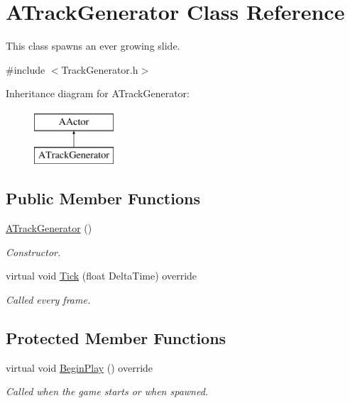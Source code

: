\hypertarget{class_a_track_generator}{}\section{A\+Track\+Generator Class Reference}
\label{class_a_track_generator}


This class spawns an ever growing slide.  




{\ttfamily \#include $<$Track\+Generator.\+h$>$}

Inheritance diagram for A\+Track\+Generator\+:\begin{figure}[H]
\begin{center}
\leavevmode
\includegraphics[height=2.000000cm]{class_a_track_generator}
\end{center}
\end{figure}
\subsection*{Public Member Functions}
\begin{DoxyCompactItemize}
\item 
\mbox{\label{class_a_track_generator_a3383e7f98eb7793881d77f222524c883}} 
\mbox{\hyperlink{class_a_track_generator_a3383e7f98eb7793881d77f222524c883}{A\+Track\+Generator}} ()
\begin{DoxyCompactList}\small\item\em Constructor. \end{DoxyCompactList}\item 
virtual void \mbox{\hyperlink{class_a_track_generator_a14b4ef8eac6a9147d9849b128015a5f8}{Tick}} (float Delta\+Time) override
\begin{DoxyCompactList}\small\item\em Called every frame. \end{DoxyCompactList}\end{DoxyCompactItemize}
\subsection*{Protected Member Functions}
\begin{DoxyCompactItemize}
\item 
\mbox{\label{class_a_track_generator_a3d0dd415286c79c74fc200265ca4dcd3}} 
virtual void \mbox{\hyperlink{class_a_track_generator_a3d0dd415286c79c74fc200265ca4dcd3}{Begin\+Play}} () override
\begin{DoxyCompactList}\small\item\em Called when the game starts or when spawned. \end{DoxyCompactList}\end{DoxyCompactItemize}

